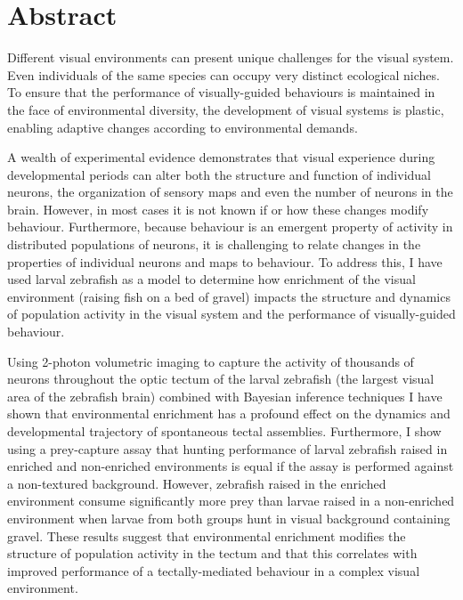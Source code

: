 \documentclass[a4paper,12pt,oneside]{report}
\begin{document}
    
    
    
    
    
    \chapter*{Abstract}
    Different visual environments can present unique challenges for the visual system. Even individuals of the same species can occupy very distinct ecological niches. To ensure that the performance of visually-guided behaviours is maintained in the face of environmental diversity, the development of visual systems is plastic, enabling adaptive changes according to environmental demands. 

    A wealth of experimental evidence demonstrates that visual experience during developmental periods can alter both the structure and function of individual neurons, the organization of sensory maps and even the number of neurons in the brain. However, in most cases it is not known if or how these changes modify behaviour. Furthermore, because behaviour is an emergent property of activity in distributed populations of neurons, it is challenging to relate changes in the properties of individual neurons and maps to behaviour.  To address this, I have used larval zebrafish as a model to determine how enrichment of the visual environment (raising fish on a bed of gravel) impacts the structure and dynamics of population activity in the visual system and the performance of visually-guided behaviour. 
    
    Using 2-photon volumetric imaging to capture the activity of thousands of neurons throughout the optic tectum of the larval zebrafish (the largest visual area of the zebrafish brain) combined with Bayesian inference techniques I have shown that environmental enrichment has a profound effect on the dynamics and developmental trajectory of spontaneous tectal assemblies. Furthermore, I show using a prey-capture assay that hunting performance of larval zebrafish raised in enriched and non-enriched environments is equal if the assay is performed against a non-textured background. However, zebrafish raised in the enriched environment consume significantly more prey than larvae raised in a non-enriched environment when larvae from both groups hunt in visual background containing gravel. These results suggest that environmental enrichment modifies the structure of population activity in the tectum and that this correlates with improved performance of a tectally-mediated behaviour in a complex visual environment. 
    
\end{document}
